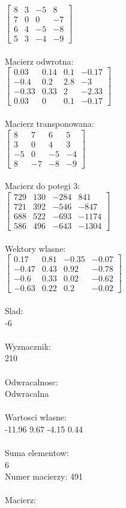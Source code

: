 \documentclass[a4paper,12pt]{article}
\begin{document}
$\begin{bmatrix} 8&3&-5&8\\7&0&0&-7\\6&4&-5&-8\\5&3&-4&-9 \end{bmatrix}$
\\
\\
Macierz odwrotna:\\

$\begin{bmatrix} 0.03&0.14&0.1&-0.17\\-0.4&0.2&2.8&-3\\-0.33&0.33&2&-2.33\\0.03&0&0.1&-0.17 \end{bmatrix}$
\\
\\
Macierz transponowana:\\

$\begin{bmatrix} 8&7&6&5\\3&0&4&3\\-5&0&-5&-4\\8&-7&-8&-9 \end{bmatrix}$
\\
\\
Macierz do potegi 3:\\

$\begin{bmatrix} 729&130&-284&841\\721&392&-546&-847\\688&522&-693&-1174\\586&496&-643&-1304 \end{bmatrix}$
\\
\\
Wektory wlasne:\\

$\begin{bmatrix} 0.17&0.81&-0.35&-0.07\\-0.47&0.43&0.92&-0.78\\-0.6&0.33&0.02&-0.62\\-0.63&0.22&0.2&-0.02 \end{bmatrix}$
\\
\\
Slad:\\
-6
\\
\\
Wyznacznik:\\
210
\\
\\
Odwracalnosc:\\
Odwracalna
\\
\\
Wartosci wlasne:\\
-11.96 9.67 -4.15 0.44
\\
\\
Suma elementow:\\
6
\\
\newpage
Numer macierzy:
491
\\
\\
Macierz:\\
\end{document}
